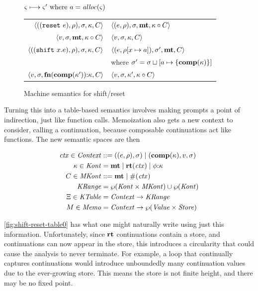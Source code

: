 \begin{figure}
  \centering
  $\varsigma \longmapsto \varsigma' \text{ where } a = \mathit{alloc}(\varsigma)$ \\
  \begin{tabular}{r|l}
    \hline
    $\langle ((\texttt{reset}\ e), \rho), \sigma, \kappa, C \rangle$
    &
    $\langle (e, \rho), \sigma, \mathbf{mt}, \kappa\circ C \rangle$
    \\
    $\langle v, \sigma, \mathbf{mt}, \kappa\circ C \rangle$
    &
    $\langle v, \sigma, {\kappa}, {C} \rangle$
    \\
    $\langle ((\texttt{shift}\ x. e), \rho), \sigma, \kappa, C \rangle$
    &
    $\langle (e, \rho[x \mapsto a]), \sigma',\mathbf{mt},C \rangle$
    \\ & where $\sigma' = \sigma\sqcup[a \mapsto \{ \mathbf{comp}(\kappa) \}]$
    \\
    $\langle v,\sigma,\mathbf{fn}{}(\mathbf{comp}(\kappa')){\tt :} \kappa, C \rangle$
    &
    $\langle v, \sigma, \kappa', \kappa\circ C \rangle$
  \end{tabular}  
  \caption{Machine semantics for shift/reset}
  \label{fig:shift-reset}
\end{figure}

Turning this into a table-based semantics involves making prompts a point of indirection, just like function calls.
%
Memoization also gets a new context to consider, calling a continuation, because composable continuations act like functions.
%
The new semantic spaces are then

\begin{align*}
  \mathit{ctx} \in \mathit{Context} &::= ((e,\rho),\sigma) \mathrel{\mid} (\mathbf{comp}(\kappa),v,\sigma) \\
  \kappa \in \mathit{Kont} &= \mathbf{mt} \mathrel{\mid} \mathbf{rt}(\mathit{ctx}) \mathrel{\mid} \phi{\tt :} \kappa \\
  C \in \mathit{MKont} &::= \mathbf{mt} \mathrel{\mid} \#(\mathit{ctx}) \\
  \mathit{KRange} &= \wp(\mathit{Kont} \times \mathit{MKont}) \cup \wp(\mathit{Kont}) \\
  \Xi \in \mathit{KTable} &= \mathit{Context} \to \mathit{KRange} \\
  M \in \mathit{Memo} &= \mathit{Context} \to \wp(\mathit{Value} \times \mathit{Store})
\end{align*}

\autoref{fig:shift-reset-table0} has what one might naturally write using just this information.
%
Unfortunately, since $\mathbf{rt}$ continuations contain a store, and continuations can now appear in the store, this introduces a circularity that could cause the analysis to never terminate.
%
For example, a loop that continually captures continuations would introduce unboundedly many continuation values due to the ever-growing store.
%
This means the store is not finite height, and there may be no fixed point.

